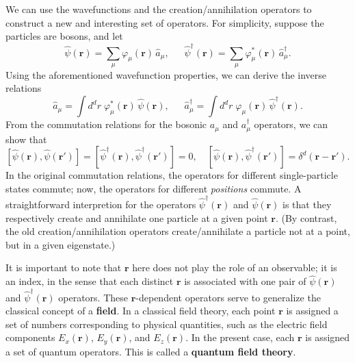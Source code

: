 \documentclass[pra,12pt]{revtex4}
\begin{document}
We can use the wavefunctions and the creation/annihilation operators
to construct a new and interesting set of operators.  For simplicity,
suppose the particles are bosons, and let
\begin{equation}
  \hat{\psi}(\mathbf{r}) = \sum_\mu \varphi_\mu(\mathbf{r}) \, \hat{a}_\mu, \quad\;\; \hat{\psi}^\dagger(\mathbf{r}) = \sum_\mu \varphi_\mu^*(\mathbf{r}) \, \hat{a}_\mu^\dagger.
\end{equation}
Using the aforementioned wavefunction properties, we can derive the
inverse relations
\begin{equation}
  \hat{a}_\mu = \int d^dr \; \varphi_\mu^*(\mathbf{r}) \, \hat{\psi}(\mathbf{r}), \quad\;\; \hat{a}_\mu^\dagger = \int d^dr \; \varphi_\mu(\mathbf{r}) \, \hat{\psi}^\dagger(\mathbf{r}).
\end{equation}
From the commutation relations for the bosonic $a_\mu$ and
$a_\mu^\dagger$ operators, we can show that
\begin{equation}
  \left[\hat{\psi}(\mathbf{r}), \hat{\psi}(\mathbf{r}')\right] = \left[\hat{\psi}^\dagger(\mathbf{r}), \hat{\psi}^\dagger(\mathbf{r}')\right] = 0, \quad \left[\hat{\psi}(\mathbf{r}), \hat{\psi}^\dagger(\mathbf{r}')\right] = \delta^d(\mathbf{r}-\mathbf{r}').
\end{equation}
In the original commutation relations, the operators for different
single-particle states commute; now, the operators for different
\textit{positions} commute.  A straightforward interpretion for the
operators $\hat{\psi}^\dagger(\mathbf{r})$ and
$\hat{\psi}(\mathbf{r})$ is that they respectively create and
annihilate one particle at a given point $\mathbf{r}$.  (By contrast,
the old creation/annihilation operators create/annihilate a particle
not at a point, but in a given eigenstate.)

It is important to note that $\mathbf{r}$ here does not play the role
of an observable; it is an index, in the sense that each distinct
$\mathbf{r}$ is associated with one pair of $\hat{\psi}(\mathbf{r})$
and $\hat{\psi}^\dagger(\mathbf{r})$ operators.  These
$\mathbf{r}$-dependent operators serve to generalize the classical
concept of a \textbf{field}.  In a classical field theory, each point
$\mathbf{r}$ is assigned a set of numbers corresponding to physical
quantities, such as the electric field components $E_x(\mathbf{r})$,
$E_y(\mathbf{r})$, and $E_z(\mathbf{r})$.  In the present case, each
$\mathbf{r}$ is assigned a set of quantum operators.  This is called a
\textbf{quantum field theory}.
\end{document}
